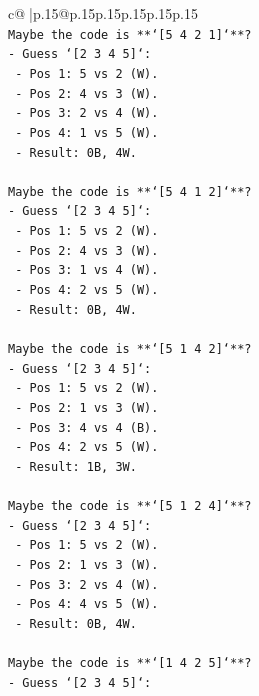\documentclass{article}
\begin{document}
{\begin{supertabular}{c@{$\;$}|p{.15\linewidth}@{}p{.15\linewidth}p{.15\linewidth}p{.15\linewidth}p{.15\linewidth}p{.15\linewidth}}
{{{\\ 
\texttt{Maybe the code is **`{[}5 4 2 1{]}`**?} \\
\texttt{{-} Guess `{[}2 3 4 5{]}`:} \\
\texttt{    {-} Pos 1: 5 vs 2 (W).} \\
\texttt{    {-} Pos 2: 4 vs 3 (W).} \\
\texttt{    {-} Pos 3: 2 vs 4 (W).} \\
\texttt{    {-} Pos 4: 1 vs 5 (W).} \\
\texttt{    {-} Result: 0B, 4W.} \\
\\ 
\texttt{Maybe the code is **`{[}5 4 1 2{]}`**?} \\
\texttt{{-} Guess `{[}2 3 4 5{]}`:} \\
\texttt{    {-} Pos 1: 5 vs 2 (W).} \\
\texttt{    {-} Pos 2: 4 vs 3 (W).} \\
\texttt{    {-} Pos 3: 1 vs 4 (W).} \\
\texttt{    {-} Pos 4: 2 vs 5 (W).} \\
\texttt{    {-} Result: 0B, 4W.} \\
\\ 
\texttt{Maybe the code is **`{[}5 1 4 2{]}`**?} \\
\texttt{{-} Guess `{[}2 3 4 5{]}`:} \\
\texttt{    {-} Pos 1: 5 vs 2 (W).} \\
\texttt{    {-} Pos 2: 1 vs 3 (W).} \\
\texttt{    {-} Pos 3: 4 vs 4 (B).} \\
\texttt{    {-} Pos 4: 2 vs 5 (W).} \\
\texttt{    {-} Result: 1B, 3W.} \\
\\ 
\texttt{Maybe the code is **`{[}5 1 2 4{]}`**?} \\
\texttt{{-} Guess `{[}2 3 4 5{]}`:} \\
\texttt{    {-} Pos 1: 5 vs 2 (W).} \\
\texttt{    {-} Pos 2: 1 vs 3 (W).} \\
\texttt{    {-} Pos 3: 2 vs 4 (W).} \\
\texttt{    {-} Pos 4: 4 vs 5 (W).} \\
\texttt{    {-} Result: 0B, 4W.} \\
\\ 
\texttt{Maybe the code is **`{[}1 4 2 5{]}`**?} \\
\texttt{{-} Guess `{[}2 3 4 5{]}`:} \\
}}}
\end{supertabular}}
\end{document}
